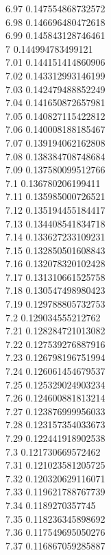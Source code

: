 {6.97	0.147554868732572\\
6.98	0.146696480472618\\
6.99	0.145843128746461\\
7	0.144994783499121\\
7.01	0.144151414860906\\
7.02	0.143312993146199\\
7.03	0.142479488852249\\
7.04	0.141650872657981\\
7.05	0.140827115422812\\
7.06	0.140008188185467\\
7.07	0.139194062162808\\
7.08	0.138384708748684\\
7.09	0.137580099512766\\
7.1	0.136780206199411\\
7.11	0.135985000726521\\
7.12	0.135194455184417\\
7.13	0.134408541834718\\
7.14	0.133627233109231\\
7.15	0.132850501608843\\
7.16	0.132078320102428\\
7.17	0.131310661525758\\
7.18	0.130547498980423\\
7.19	0.129788805732753\\
7.2	0.129034555212762\\
7.21	0.128284721013082\\
7.22	0.127539276887916\\
7.23	0.126798196751994\\
7.24	0.126061454679537\\
7.25	0.125329024903234\\
7.26	0.124600881813214\\
7.27	0.123876999956033\\
7.28	0.123157354033673\\
7.29	0.122441918902538\\
7.3	0.121730669572462\\
7.31	0.121023581205725\\
7.32	0.120320629116071\\
7.33	0.119621788767739\\
7.34	0.1189270357745\\
7.35	0.118236345898692\\
7.36	0.117549695050276\\
7.37	0.116867059285887\\
}
